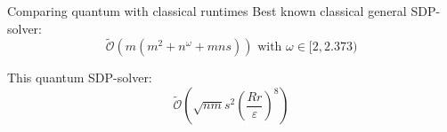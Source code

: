 \begin{frame}{Comparing quantum with classical runtimes}
Best known classical general SDP-solver:
\begin{equation*}
\tilde{\mathcal{O}}(m(m^2+n^\omega+mns)) \text{ with } \omega\in[2,2.373)
\end{equation*}

\vspace{1cm}

This quantum SDP-solver:
\begin{equation*}
\tilde{\mathcal{O}}\left(\sqrt{nm}s^2\left(\frac{Rr}{\varepsilon}\right)^8\right)
\end{equation*}

\end{frame}